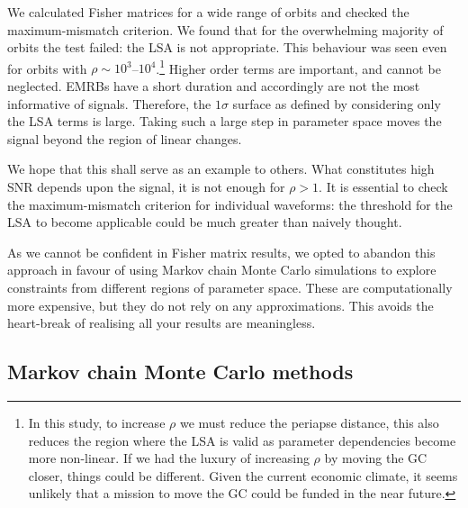 \documentclass[useAMS,usedcolumn,usegraphicx,usenatbib]{mn2e}
\begin{document}
We calculated Fisher matrices for a wide range of orbits and checked the maximum-mismatch criterion. We found that for the overwhelming majority of orbits the test failed: the LSA is not appropriate. This behaviour was seen even for orbits with $\rho \sim 10^3$--$10^4$.\footnote{In this study, to increase $\rho$ we must reduce the periapse distance, this also reduces the region where the LSA is valid as parameter dependencies become more non-linear. If we had the luxury of increasing $\rho$ by moving the GC closer, things could be different. Given the current economic climate, it seems unlikely that a mission to move the GC could be funded in the near future.} Higher order terms are important, and cannot be neglected. EMRBs have a short duration and accordingly are not the most informative of signals. Therefore, the $1\sigma$ surface as defined by considering only the LSA terms is large. Taking such a large step in parameter space moves the signal beyond the region of linear changes.

We hope that this shall serve as an example to others. What constitutes high SNR depends upon the signal, it is not enough for $\rho > 1$. It is essential to check the maximum-mismatch criterion for individual waveforms: the threshold for the LSA to become applicable could be much greater than naively thought.

As we cannot be confident in Fisher matrix results, we opted to abandon this approach in favour of using Markov chain Monte Carlo simulations to explore constraints from different regions of parameter space. These are computationally more expensive, but they do not rely on any approximations. This avoids the heart-break of realising all your results are meaningless.

\subsection{Markov chain Monte Carlo methods}
\end{document}
